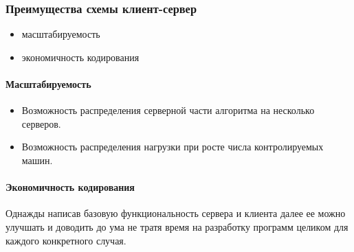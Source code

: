 \subsubsection{Преимущества схемы клиент-сервер}

\begin{itemize}
\item{масштабируемость}
\item{экономичность кодирования}
\end{itemize}

\paragraph{Масштабируемость}

\begin{itemize}
\item{
Возможность распределения серверной части алгоритма на несколько серверов.}
\item{
Возможность распределения нагрузки при росте числа контролируемых машин.}
\end{itemize}

\paragraph{Экономичность кодирования}

Однажды написав базовую функциональность сервера и клиента далее ее
можно улучшать и доводить до ума не тратя время на разработку программ
целиком для каждого конкретного случая.

